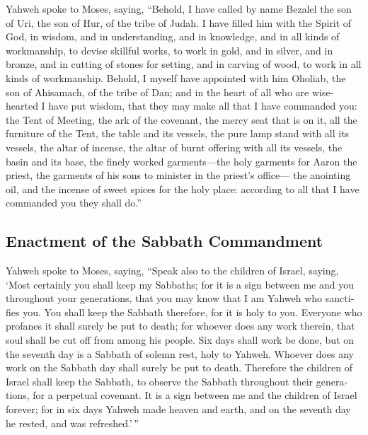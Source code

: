 \begin{paracol}{2}
\begin{otherlanguage}{english}
 Yahweh spoke to Moses, saying,  ``Behold, I
have called by name Bezalel the son of Uri, the son of Hur, of the tribe
of Judah.  I have filled him with the Spirit of God, in
wisdom, and in understanding, and in knowledge, and in all kinds of
workmanship,  to devise skillful works, to work in gold,
and in silver, and in bronze,  and in cutting of stones
for setting, and in carving of wood, to work in all kinds of
workmanship.  Behold, I myself have appointed with him
Oholiab, the son of Ahisamach, of the tribe of Dan; and in the heart of
all who are wise-hearted I have put wisdom, that they may make all that
I have commanded you:  the Tent of Meeting, the ark of the
covenant, the mercy seat that is on it, all the furniture of the Tent,
 the table and its vessels, the pure lamp stand with all
its vessels, the altar of incense,  the altar of burnt
offering with all its vessels, the basin and its base, 
the finely worked garments---the holy garments for Aaron the priest, the
garments of his sons to minister in the priest's office---
 the anointing oil, and the incense of sweet spices for
the holy place: according to all that I have commanded you they shall
do.''

\hypertarget{enactment-of-the-sabbath-commandment}{%
\subsection{Enactment of the Sabbath
Commandment}\label{enactment-of-the-sabbath-commandment}}

 Yahweh spoke to Moses, saying,  ``Speak
also to the children of Israel, saying, `Most certainly you shall keep
my Sabbaths; for it is a sign between me and you throughout your
generations, that you may know that I am Yahweh who sanctifies you.
 You shall keep the Sabbath therefore, for it is holy to
you. Everyone who profanes it shall surely be put to death; for whoever
does any work therein, that soul shall be cut off from among his people.
 Six days shall work be done, but on the seventh day is a
Sabbath of solemn rest, holy to Yahweh. Whoever does any work on the
Sabbath day shall surely be put to death.  Therefore the
children of Israel shall keep the Sabbath, to observe the Sabbath
throughout their generations, for a perpetual covenant. 
It is a sign between me and the children of Israel forever; for in six
days Yahweh made heaven and earth, and on the seventh day he rested, and
was refreshed.'\,''


\end{otherlanguage}
\end{paracol}

